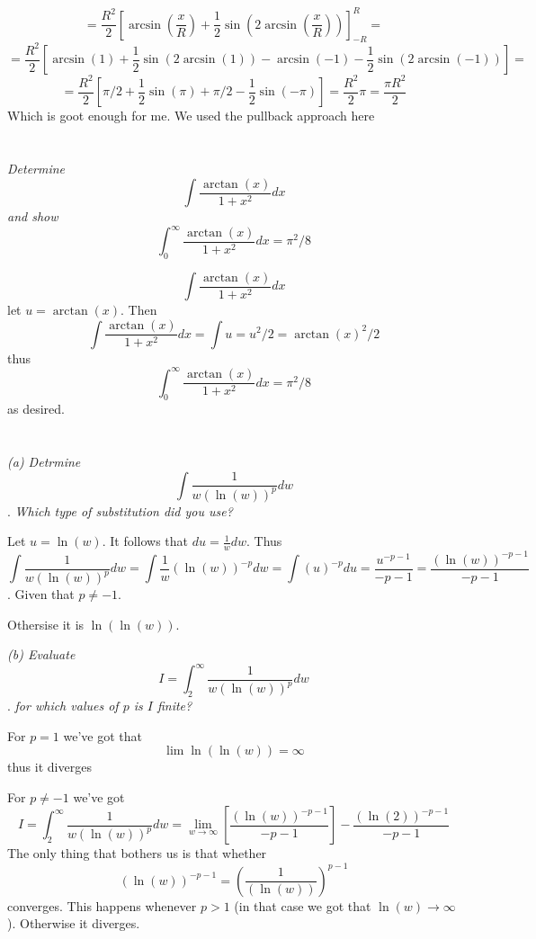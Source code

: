 \documentclass[11pt,oneside,titlepage]{book}
\begin{document}
$$
= \frac{R^2}{2}\left[\arcsin(\frac{x}{R}) + \frac{1}{2} \sin(2\arcsin(\frac{x}{R}))\right]_{-R}^R =
$$
$$
=
\frac{R^2}{2} \left[\arcsin(1) + \frac{1}{2} \sin (2 \arcsin(1)) - \arcsin(-1) -
  \frac{1}{2} \sin (2 \arcsin(-1))\right]= 
$$
$$
=
\frac{R^2}{2} \left[\pi/2 + \frac{1}{2} \sin (\pi) + \pi/2 -
  \frac{1}{2} \sin (-\pi)\right]=
\frac{R^2}{2} \pi = \frac{\pi R^2}{2}
$$
Which is goot enough for me. We used the pullback approach here

\section{}

\textit{Determine }
$$\int {\frac{\arctan(x)}{1 + x^2} dx}$$
\textit{and show }
$$\int_0^\infty {\frac{\arctan(x)}{1 + x^2} dx} = \pi^2/8$$

$$\int {\frac{\arctan(x)}{1 + x^2} dx} $$
let $u = \arctan(x)$. Then
$$\int {\frac{\arctan(x)}{1 + x^2} dx} = \int u = u^2/2 = \arctan(x)^2/2$$
thus
$$\int_0^\infty {\frac{\arctan(x)}{1 + x^2} dx} = \pi^2/8$$
as desired.

\section{}

\textit{(a) Detrmine }
$$\int{\frac{1}{w (\ln(w))^p} dw}$$.
\textit{Which type of substitution did you use?}

Let $u = \ln(w)$. It follows that $du = \frac{1}{w} dw$. Thus
$$\int{\frac{1}{w (\ln(w))^p} dw} =
\int{\frac{1}{w } (\ln(w))^{-p} dw} =
\int{(u)^{-p} du} =  \frac{u^{-p - 1}}{-p - 1} = \frac{(\ln(w))^{-p - 1}}{-p - 1}
$$.
Given that $p \neq -1$.

Othersise it is $\ln(\ln(w))$.

\textit{(b) Evaluate }
$$I = \int_2^\infty{\frac{1}{w (\ln(w))^p} dw}$$.
\textit{for which values of $p$ is $I$ finite?}

For $p = 1$ we've got that
$$\lim{\ln(\ln(w))} = \infty$$
thus it diverges

For $p \neq -1$ we've got
$$I = \int_2^\infty{\frac{1}{w (\ln(w))^p} dw} =
\lim_{w \to \infty}{\left[\frac{(\ln(w))^{-p - 1}}{-p - 1}\right]} - \frac{(\ln(2))^{-p - 1}}{-p - 1}
$$
The only thing that bothers us is that whether
$$(\ln(w))^{-p - 1} = (\frac{1}{(\ln(w))})^{p - 1}$$
converges. This happens whenever $p > 1$ (in that case we got that $\ln(w) \to \infty$).
Otherwise it diverges.

\section{}
\end{document}
